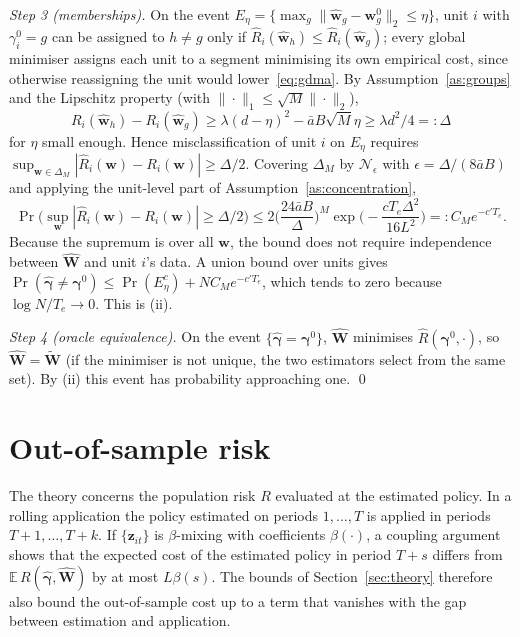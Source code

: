 \emph{Step 3 (memberships).}
On the event $E_\eta=\{\max_g\|\widehat{\bm w}_g-\bm w^0_g\|_2\le\eta\}$, unit $i$ with $\gamma^0_i=g$ can be assigned to $h\ne g$ only if $\widehat R_i(\widehat{\bm w}_h)\le\widehat R_i(\widehat{\bm w}_g)$; every global minimiser assigns each unit to a segment minimising its own empirical cost, since otherwise reassigning the unit would lower~\eqref{eq:gdma}.
By Assumption~\ref{as:groups} and the Lipschitz property (with $\|\cdot\|_1\le\sqrt M\|\cdot\|_2$),
\[
R_i(\widehat{\bm w}_h)-R_i(\widehat{\bm w}_g)\ge\lambda(d-\eta)^2-\bar aB\sqrt M\eta\ge\lambda d^2/4=:\Delta
\]
for $\eta$ small enough.
Hence misclassification of unit $i$ on $E_\eta$ requires $\sup_{\bm w\in\Delta_M}|\widehat R_i(\bm w)-R_i(\bm w)|\ge\Delta/2$.
Covering $\Delta_M$ by $\mathcal N_\epsilon$ with $\epsilon=\Delta/(8\bar aB)$ and applying the unit-level part of Assumption~\ref{as:concentration},
\[
\Pr\Big(\sup_{\bm w}|\widehat R_i(\bm w)-R_i(\bm w)|\ge\Delta/2\Big)\le2\Big(\frac{24\bar aB}{\Delta}\Big)^M\exp\!\Big(-\frac{cT_e\Delta^2}{16L^2}\Big)=:C_M e^{-c'T_e}.
\]
Because the supremum is over all $\bm w$, the bound does not require independence between $\widehat{\bm W}$ and unit $i$'s data.
A union bound over units gives $\Pr(\widehat{\bm\gamma}\ne\bm\gamma^0)\le\Pr(E_\eta^c)+NC_Me^{-c'T_e}$, which tends to zero because $\log N/T_e\to0$. This is (ii).

\emph{Step 4 (oracle equivalence).}
On the event $\{\widehat{\bm\gamma}=\bm\gamma^0\}$, $\widehat{\bm W}$ minimises $\widehat R(\bm\gamma^0,\cdot)$, so $\widehat{\bm W}=\widetilde{\bm W}$ (if the minimiser is not unique, the two estimators select from the same set).
By (ii) this event has probability approaching one. \qed

\section{Out-of-sample risk}\label{app:oos}

The theory concerns the population risk $R$ evaluated at the estimated policy.
In a rolling application the policy estimated on periods $1,\dots,T$ is applied in periods $T+1,\dots,T+k$.
If $\{\bm z_{it}\}$ is $\beta$-mixing with coefficients $\beta(\cdot)$, a coupling argument \citep{Yu1994} shows that the expected cost of the estimated policy in period $T+s$ differs from $\mathbb E\,R(\widehat{\bm\gamma},\widehat{\bm W})$ by at most $L\beta(s)$.
The bounds of Section~\ref{sec:theory} therefore also bound the out-of-sample cost up to a term that vanishes with the gap between estimation and application.

